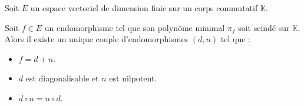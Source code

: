 






  Soit $E$ un espace vectoriel de dimension finie sur un corps commutatif $\mathbb{K}$.

  \begin{theorem}
    Soit $f \in E$ un endomorphisme tel que son polynôme minimal $\pi_f$ soit scindé sur $\mathbb{K}$. Alors il existe un unique couple d'endomorphismes $(d, n)$ tel que :
    \begin{itemize}
      \item $f = d + n$.
      \item $d$ est diagonalisable et $n$ est nilpotent.
      \item $d \circ n = n \circ d$.
    \end{itemize}
  \end{theorem}

